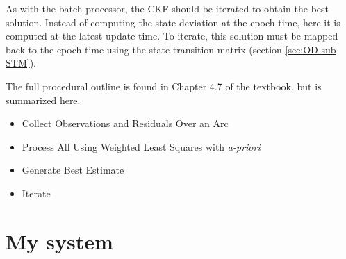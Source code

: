 \documentclass[12pt,a4paper,oneside]{article}
\numberwithin{equation}{section}   		%
\begin{document}
As with the batch processor, the CKF should be iterated to obtain the best solution. Instead of computing the state deviation at the epoch time, here it is computed at the latest update time. To iterate, this solution must be mapped back to the epoch time using the state transition matrix (section \ref{sec:OD sub STM}).

The full procedural outline is found in Chapter 4.7 of the textbook, but is summarized here.


\begin{itemize}
	\renewcommand{\labelitemi}{$\bullet$}
	\item Collect Observations and Residuals Over an  Arc
	\item Process All Using Weighted Least Squares with \emph{a-priori}
	\item Generate Best Estimate
	\item Iterate
\end{itemize}







\section{My system}








\newpage



%
\end{document}
